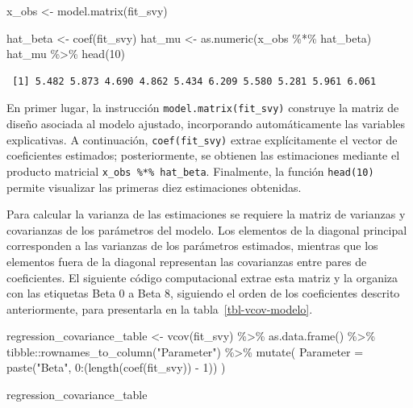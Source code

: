 \documentclass[
  spanish,
  11pt,
  letterpaper,
  oneside,
  open=any]{scrbook}
\newenvironment{Shaded}{\begin{snugshade}}{\end{snugshade}}
\newcommand{\AttributeTok}[1]{\textcolor[rgb]{0.40,0.45,0.13}{#1}}
\newcommand{\DecValTok}[1]{\textcolor[rgb]{0.68,0.00,0.00}{#1}}
\newcommand{\FunctionTok}[1]{\textcolor[rgb]{0.28,0.35,0.67}{#1}}
\newcommand{\NormalTok}[1]{\textcolor[rgb]{0.00,0.23,0.31}{#1}}
\newcommand{\OtherTok}[1]{\textcolor[rgb]{0.00,0.23,0.31}{#1}}
\newcommand{\SpecialCharTok}[1]{\textcolor[rgb]{0.37,0.37,0.37}{#1}}
\newcommand{\StringTok}[1]{\textcolor[rgb]{0.13,0.47,0.30}{#1}}
\begin{document}
\begin{Shaded}
\begin{Highlighting}[]
\NormalTok{x\_obs }\OtherTok{\textless{}{-}} \FunctionTok{model.matrix}\NormalTok{(fit\_svy)}

\NormalTok{hat\_beta }\OtherTok{\textless{}{-}} \FunctionTok{coef}\NormalTok{(fit\_svy)}
\NormalTok{hat\_mu }\OtherTok{\textless{}{-}} \FunctionTok{as.numeric}\NormalTok{(x\_obs }\SpecialCharTok{\%*\%}\NormalTok{ hat\_beta)}
\NormalTok{hat\_mu }\SpecialCharTok{\%\textgreater{}\%}
  \FunctionTok{head}\NormalTok{(}\DecValTok{10}\NormalTok{)}
\end{Highlighting}
\end{Shaded}

\begin{verbatim}
 [1] 5.482 5.873 4.690 4.862 5.434 6.209 5.580 5.281 5.961 6.061
\end{verbatim}

En primer lugar, la instrucción \texttt{model.matrix(fit\_svy)}
construye la matriz de diseño asociada al modelo ajustado, incorporando
automáticamente las variables explicativas. A continuación,
\texttt{coef(fit\_svy)} extrae explícitamente el vector de coeficientes
estimados; posteriormente, se obtienen las estimaciones mediante el
producto matricial \texttt{x\_obs\ \%*\%\ hat\_beta}. Finalmente, la
función \texttt{head(10)} permite visualizar las primeras diez
estimaciones obtenidas.

Para calcular la varianza de las estimaciones se requiere la matriz de
varianzas y covarianzas de los parámetros del modelo. Los elementos de
la diagonal principal corresponden a las varianzas de los parámetros
estimados, mientras que los elementos fuera de la diagonal representan
las covarianzas entre pares de coeficientes. El siguiente código
computacional extrae esta matriz y la organiza con las etiquetas Beta 0
a Beta 8, siguiendo el orden de los coeficientes descrito anteriormente,
para presentarla en la tabla~\ref{tbl-vcov-modelo}.

\begin{Shaded}
\begin{Highlighting}[]
\NormalTok{regression\_covariance\_table }\OtherTok{\textless{}{-}} \FunctionTok{vcov}\NormalTok{(fit\_svy) }\SpecialCharTok{\%\textgreater{}\%}
  \FunctionTok{as.data.frame}\NormalTok{() }\SpecialCharTok{\%\textgreater{}\%}
\NormalTok{  tibble}\SpecialCharTok{::}\FunctionTok{rownames\_to\_column}\NormalTok{(}\StringTok{"Parameter"}\NormalTok{) }\SpecialCharTok{\%\textgreater{}\%}
  \FunctionTok{mutate}\NormalTok{(}
    \AttributeTok{Parameter =} \FunctionTok{paste}\NormalTok{(}\StringTok{"Beta"}\NormalTok{, }\DecValTok{0}\SpecialCharTok{:}\NormalTok{(}\FunctionTok{length}\NormalTok{(}\FunctionTok{coef}\NormalTok{(fit\_svy)) }\SpecialCharTok{{-}} \DecValTok{1}\NormalTok{))}
\NormalTok{  )}

\NormalTok{regression\_covariance\_table}
\end{Highlighting}
\end{Shaded}
\end{document}
